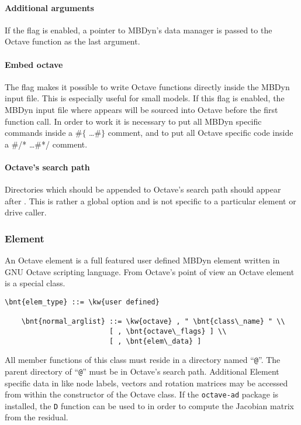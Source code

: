 \paragraph{Additional arguments}
If the flag  is enabled, a pointer to MBDyn's data manager is passed to the Octave function as the last argument.

\paragraph{Embed octave}
The flag  makes it possible to write Octave functions directly inside the MBDyn input file.
This is especially useful for small models. If this flag is enabled, the MBDyn input file where  appears will be sourced into Octave before the first function call.
In order to work it is necessary to put all MBDyn specific commands inside a $\#\lbrace$ \ldots $\#\rbrace$ comment, and to put all Octave specific code inside a \#/* \ldots \#*/ comment.

\paragraph{Octave's search path}
Directories which should be appended to Octave's search path should appear after .
This is rather a global option and is not specific to a particular element or drive caller.

\subsubsection{Element}
An Octave element is a full featured user defined MBDyn element written in GNU Octave scripting language.
From Octave's point of view an Octave element is a special class.
\begin{Verbatim}[commandchars=\\\{\}]
    \bnt{elem_type} ::= \kw{user defined}

    \bnt{normal_arglist} ::= \kw{octave} , " \bnt{class\_name} " \\
                         [ , \bnt{octave\_flags} ] \\
                         [ , \bnt{elem\_data} ]
\end{Verbatim}
All member functions of this class must reside in a directory named ``\texttt{@}''.
The parent directory of ``\texttt{@}'' must be in Octave's search path.
Additional Element specific data in  like node labels,
vectors and rotation matrices may be accessed from within the constructor
of the Octave class.
If the \texttt{octave-ad} package is installed,
the \texttt{D} function can be used to in order to compute
the Jacobian matrix from the residual.

